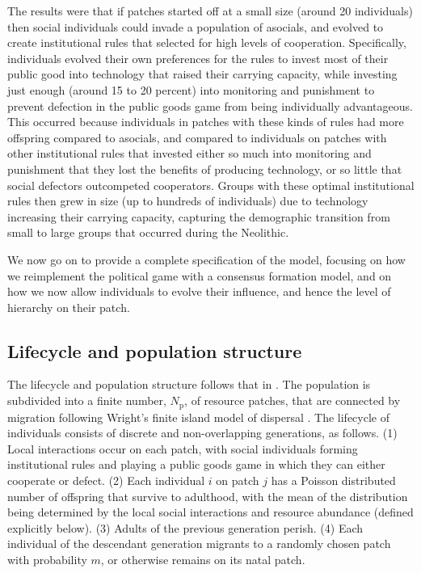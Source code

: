 \documentclass{rstb}
\begin{document}
\begin{linenumbers}
The results were that if patches started off at a small size (around 20 individuals) then social individuals could invade a population of asocials, and evolved to create institutional rules that selected for high levels of cooperation. Specifically, individuals evolved their own preferences for the rules to invest most of their public good into technology that raised their carrying capacity, while investing just enough (around 15 to 20 percent) into monitoring and punishment to prevent defection in the public goods game from being individually advantageous. This occurred because individuals in patches with these kinds of rules had more offspring compared to asocials, and compared to individuals on patches with other institutional rules that invested either so much into monitoring and punishment that they lost the benefits of producing technology, or so little that social defectors outcompeted cooperators. Groups with these optimal institutional rules then grew in size (up to hundreds of individuals) due to technology increasing their carrying capacity, capturing the demographic transition from small to large groups that occurred during the Neolithic.

We now go on to provide a complete specification of the model, focusing on how we reimplement the political game with a consensus formation model, and on how we now allow individuals to evolve their influence, and hence the level of hierarchy on their patch.
\subsection{Lifecycle and population structure}

The lifecycle and population structure follows that in \cite{Powers:2013:a}. The population is subdivided into a finite number, $N_\mathrm{p}$, of resource patches, that are connected by migration following Wright's finite island model of dispersal \cite{Wright:1931:a}. The lifecycle of individuals consists of discrete and non-overlapping generations, as follows. (1) Local interactions occur on each patch, with social individuals forming institutional rules and playing a public goods game in which they can either cooperate or defect. (2) Each individual $i$ on patch $j$ has a Poisson distributed number of offspring that survive to adulthood, with the mean of the distribution being determined by the local social interactions and resource abundance (defined explicitly below). (3) Adults of the previous generation perish. (4) Each individual of the descendant generation migrants to a randomly chosen patch with probability $m$, or otherwise remains on its natal patch. 


\end{linenumbers}
\end{document}
